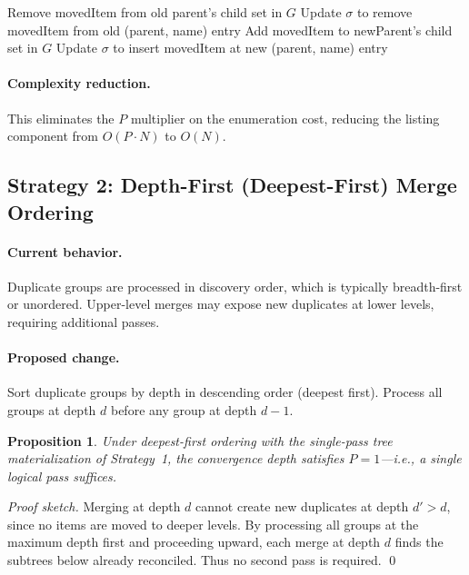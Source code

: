 \documentclass[12pt,a4paper]{article}
\newtheorem{proposition}[theorem]{Proposition}
\begin{document}
\begin{algorithmic}[1]
  \State Remove movedItem from old parent's child set in $G$
  \State Update $\sigma$ to remove movedItem from old (parent, name) entry
  \State Add movedItem to newParent's child set in $G$
  \State Update $\sigma$ to insert movedItem at new (parent, name) entry
\EndFunction
\end{algorithmic}

\paragraph{Complexity reduction.} This eliminates the $P$ multiplier on the enumeration cost, reducing the listing component from $O(P \cdot N)$ to $O(N)$.

\subsection{Strategy 2: Depth-First (Deepest-First) Merge Ordering}

\paragraph{Current behavior.} Duplicate groups are processed in discovery order, which is typically breadth-first or unordered. Upper-level merges may expose new duplicates at lower levels, requiring additional passes.

\paragraph{Proposed change.} Sort duplicate groups by depth in descending order (deepest first). Process all groups at depth $d$ before any group at depth $d - 1$.

\begin{proposition}
Under deepest-first ordering with the single-pass tree materialization of Strategy~1, the convergence depth satisfies $P = 1$---i.e., a single logical pass suffices.
\end{proposition}

\begin{proof}[Proof sketch]
Merging at depth $d$ cannot create new duplicates at depth $d' > d$, since no items are moved to deeper levels. By processing all groups at the maximum depth first and proceeding upward, each merge at depth $d$ finds the subtrees below already reconciled. Thus no second pass is required. \qed
\end{proof}
\end{document}
